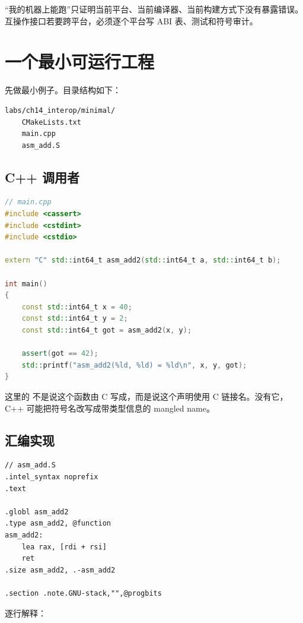 \begin{warningbox}
“我的机器上能跑”只证明当前平台、当前编译器、当前构建方式下没有暴露错误。互操作接口若要跨平台，必须逐个平台写 ABI 表、测试和符号审计。
\end{warningbox}

\section{一个最小可运行工程}

先做最小例子。目录结构如下：

\begin{lstlisting}
labs/ch14_interop/minimal/
    CMakeLists.txt
    main.cpp
    asm_add.S
\end{lstlisting}

\subsection{C++ 调用者}

\begin{lstlisting}[language=C++]
// main.cpp
#include <cassert>
#include <cstdint>
#include <cstdio>

extern "C" std::int64_t asm_add2(std::int64_t a, std::int64_t b);

int main()
{
    const std::int64_t x = 40;
    const std::int64_t y = 2;
    const std::int64_t got = asm_add2(x, y);

    assert(got == 42);
    std::printf("asm_add2(%ld, %ld) = %ld\n", x, y, got);
}
\end{lstlisting}

这里的  不是说这个函数由 C 写成，而是说这个声明使用 C 链接名。没有它，C++ 可能把符号名改写成带类型信息的 mangled name。

\subsection{汇编实现}

\begin{lstlisting}
// asm_add.S
.intel_syntax noprefix
.text

.globl asm_add2
.type asm_add2, @function
asm_add2:
    lea rax, [rdi + rsi]
    ret
.size asm_add2, .-asm_add2

.section .note.GNU-stack,"",@progbits
\end{lstlisting}

逐行解释：

